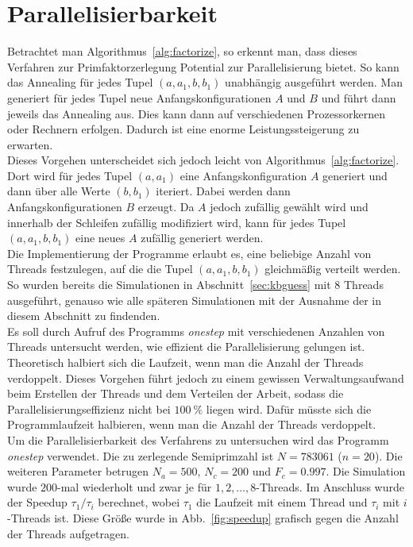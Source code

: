 \section{Parallelisierbarkeit}\label{sec:parallel}
Betrachtet man Algorithmus~\ref{alg:factorize}, so erkennt man, dass dieses Verfahren zur Primfaktorzerlegung Potential zur Parallelisierung bietet. So kann das Annealing für jedes Tupel $\left(a,a_1,b,b_1\right)$ unabhängig ausgeführt werden. Man generiert für jedes Tupel neue Anfangskonfigurationen $A$ und $B$ und führt dann jeweils das Annealing aus. Dies kann dann auf verschiedenen Prozessorkernen oder Rechnern erfolgen. Dadurch ist eine enorme Leistungssteigerung zu erwarten.\\
Dieses Vorgehen unterscheidet sich jedoch leicht von Algorithmus~\ref{alg:factorize}. Dort wird für jedes Tupel $\left(a,a_1\right)$ eine Anfangskonfiguration $A$ generiert und dann über alle Werte $\left(b,b_1\right)$ iteriert. Dabei werden dann Anfangskonfigurationen $B$ erzeugt. Da $A$ jedoch zufällig gewählt wird und innerhalb der Schleifen zufällig modifiziert wird, kann für jedes Tupel $\left(a,a_1,b,b_1\right)$ eine neues $A$ zufällig generiert werden. \\
Die Implementierung der Programme erlaubt es, eine beliebige Anzahl von Threads festzulegen, auf die die Tupel $\left(a,a_1,b,b_1\right)$ gleichmäßig verteilt werden. So wurden bereits die Simulationen in Abschnitt~\ref{sec:kbguess} mit $8$ Threads ausgeführt, genauso wie alle späteren Simulationen mit der Ausnahme der in diesem Abschnitt zu findenden. \\
Es soll durch Aufruf des Programms \textit{onestep} mit verschiedenen Anzahlen von Threads untersucht werden, wie effizient die Parallelisierung gelungen ist. Theoretisch halbiert sich die Laufzeit, wenn man die Anzahl der Threads verdoppelt. Dieses Vorgehen führt jedoch zu einem gewissen Verwaltungsaufwand beim Erstellen der Threads und dem Verteilen der Arbeit, sodass die Parallelisierungseffizienz nicht bei $\SI{100}{\percent}$ liegen wird. Dafür müsste sich die Programmlaufzeit halbieren, wenn man die Anzahl der Threads verdoppelt.\\
Um die Parallelisierbarkeit des Verfahrens zu untersuchen wird das Programm \textit{onestep} verwendet. Die zu zerlegende Semiprimzahl ist $N=783061$ ($n=20$). Die weiteren Parameter betrugen $N_a=500$, $N_c=200$ und $F_c=0.997$. Die Simulation wurde $200$-mal wiederholt und zwar je für $1, 2, \dots, 8$-Threads. Im Anschluss wurde der Speedup $\tau_1/\tau_i$ berechnet, wobei $\tau_1$ die Laufzeit mit einem Thread und $\tau_i$ mit $i$-Threads ist. Diese Größe wurde in Abb.~\ref{fig:speedup} grafisch gegen die Anzahl der Threads aufgetragen.\\

